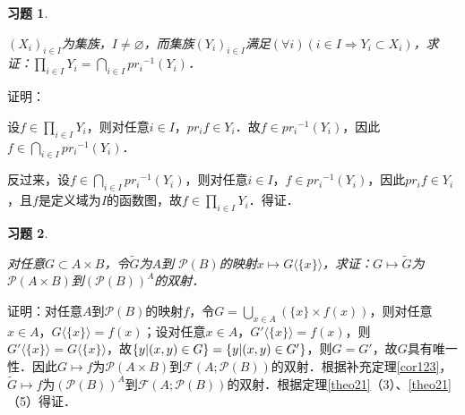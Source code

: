 \documentclass[12pt, a4paper, oneside]{book}
\newtheorem{exer}{习题}
\begin{document}
			\begin{exer}\label{exer64}
				\hfill\par
				$(X_i)_{i\in I}$为集族，$I\neq \varnothing$，而集族$(Y_i)_{i\in I}$满足$(\forall i)(i\in I\Rightarrow Y_i\subset X_i)$，求证：$\prod\limits_{i\in I}Y_i=\bigcap\limits_{i\in I}{pr_i}^{-1}(Y_i)$．
			\end{exer}
			证明：
			\par
			设$f\in \prod\limits_{i\in I}Y_i$，则对任意$i\in I$，$pr_if\in Y_i$．故$f\in {pr_i}^{-1}(Y_i)$，因此$f\in \bigcap\limits_{i\in I}{pr_i}^{-1}(Y_i)$．
			\par
			反过来，设$f\in \bigcap\limits_{i\in I}{pr_i}^{-1}(Y_i)$，则对任意$i\in I$，$f\in {pr_i}^{-1}(Y_i)$，因此$pr_if\in Y_i$，且$f$是定义域为$I$的函数图，故$f\in \prod\limits_{i\in I}Y_i$．得证．
			
			\begin{exer}\label{exer65}
				\hfill\par
				对任意$G\subset A\times B$，令$\tilde{G}$为$A$到 $\mathcal{P}(B)$的映射$x\mapsto G\langle \{x\} \rangle $，求证：$G\mapsto \tilde{G}$为 $\mathcal{P}(A\times B)$到$( \mathcal{P}(B))^A$的双射．
			\end{exer}
			证明：对任意$A$到$\mathcal{P}(B)$的映射$f$，令$G=\bigcup\limits_{x\in A}(\{x\}\times f(x))$，则对任意$x\in A$，$G\langle \{x\} \rangle =f(x)$；设对任意$x\in A$，$G'\langle \{x\} \rangle =f(x)$，则$G'\langle \{x\} \rangle =G\langle \{x\} \rangle $，故$\{y|(x, y)\in G\}=\{y|(x, y)\\\in G'\}$，则$G=G'$，故$G$具有唯一性．因此$G\mapsto f$为$\mathcal{P}(A\times B)$到$\mathcal{F}(A; \mathcal{P}(B))$的双射．根据补充定理\ref{cor123}，$\tilde{G}\mapsto f$为$( \mathcal{P}(B))^A$到$\mathcal{F}(A; \mathcal{P}(B))$的双射．根据定理\ref{theo21}（3）、\ref{theo21}（5）得证．
			
\end{document}
